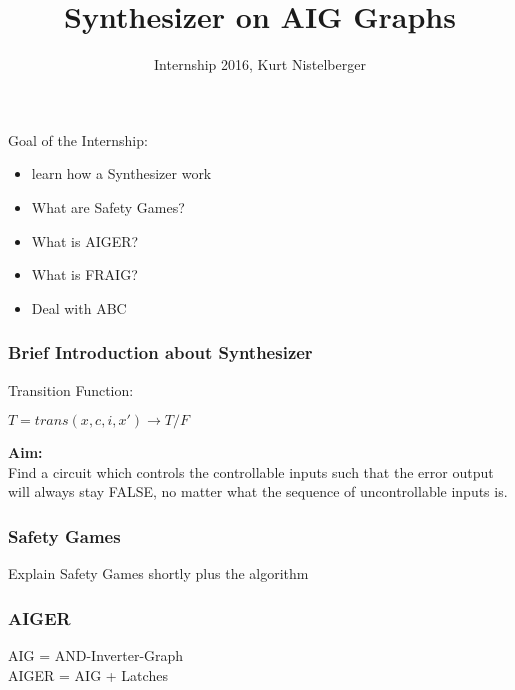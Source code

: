 \documentclass{beamer}
\title{Synthesizer on AIG Graphs}
\author{Internship 2016, Kurt Nistelberger}
\begin{document}
\maketitle
 
 
\begin{frame}

{\LARGE Goal of the Internship:} \\

\begin{itemize}
\item learn how a Synthesizer work
\item What are Safety Games?
\item What is AIGER?
\item What is FRAIG?
\item Deal with ABC
\end{itemize}

\end{frame}


\begin{frame}
\frametitle{Brief Introduction about Synthesizer}


\begin{figure}
\end{figure}

Transition Function:\\
\begin{center}
$T = trans( x, c, i, x' ) \rightarrow T/F$  \\
\end{center}

\textbf{Aim:}\\
{\small
Find a circuit which controls the controllable inputs such that the
error output will always stay FALSE, no matter what the sequence of
uncontrollable inputs is.}

\end{frame}


\begin{frame}
\frametitle{Safety Games}

Explain Safety Games shortly plus the algorithm

\end{frame}


\begin{frame}
\frametitle{AIGER}

AIG = AND-Inverter-Graph\\
AIGER = AIG + Latches\\

\end{frame}
\end{document}
